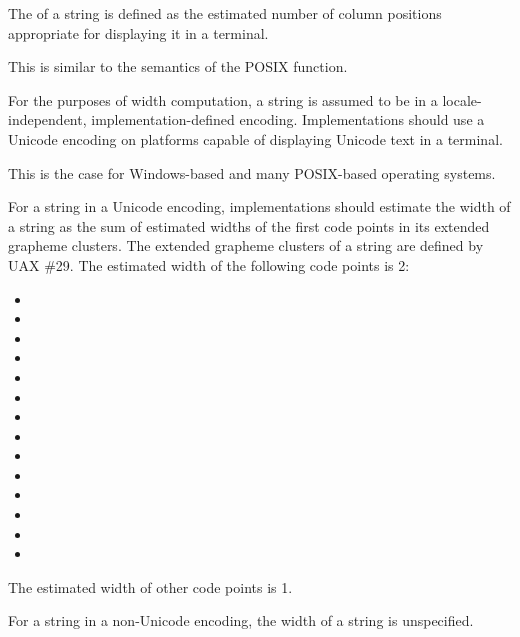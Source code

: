 \pnum
{}%
The  of a string is defined as
the estimated number of column positions appropriate
for displaying it in a terminal.
\begin{note}
This is similar to the semantics of the POSIX  function.
\end{note}

\pnum
For the purposes of width computation,
a string is assumed to be in
a locale-independent, implementation-defined encoding.
Implementations should use a Unicode encoding
on platforms capable of displaying Unicode text in a terminal.
\begin{note}
This is the case for Windows-based and many POSIX-based operating systems.
\end{note}

\pnum
For a string in a Unicode encoding,
implementations should estimate the width of a string
as the sum of estimated widths of
the first code points in its extended grapheme clusters.
The extended grapheme clusters of a string are defined by UAX \#29.
The estimated width of the following code points is 2:
\begin{itemize}
\item {}
\item {}
\item {}
\item {}
\item {}
\item {}
\item {}
\item {}
\item {}
\item {}
\item {}
\item {}
\item {}
\item {}
\end{itemize}
The estimated width of other code points is 1.

\pnum
For a string in a non-Unicode encoding, the width of a string is unspecified.

